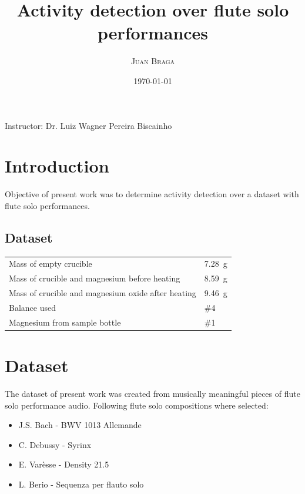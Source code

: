\documentclass{article}
\title{Activity detection over flute solo performances} %
\author{\textsc{Juan Braga}} %
\date{\today} %
\begin{document}
\maketitle %
\begin{center}
Instructor: Dr. Luiz Wagner Pereira Biscainho %
\end{center}



\section{Introduction}

Objective of present work was to determine activity detection over a dataset with flute solo performances. 

\subsection{Dataset}
\begin{tabular}{ll}
Mass of empty crucible & \SI{7.28}{\gram}\\
Mass of crucible and magnesium before heating & \SI{8.59}{\gram}\\
Mass of crucible and magnesium oxide after heating & \SI{9.46}{\gram}\\
Balance used & \#4\\
Magnesium from sample bottle & \#1
\end{tabular}

 

\section{Dataset}
The dataset of present work was created from musically meaningful pieces of flute solo performance audio. Following flute solo compositions where selected:   
\begin{itemize}  
\item J.S. Bach - BWV 1013 Allemande 
\item C. Debussy - Syrinx
\item E. Varèsse - Density 21.5 
\item L. Berio - Sequenza per flauto solo 
\end{itemize}
\end{document}
